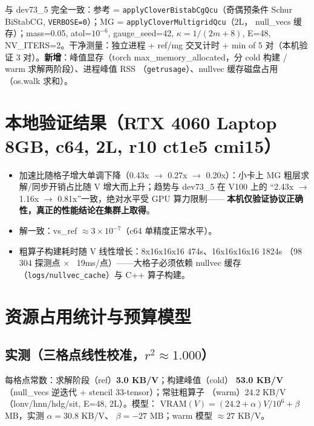 \documentclass[11pt,a4paper]{article}
\begin{document}
与 dev73\_5 完全一致：参考 = \texttt{applyCloverBistabCgQcu}（奇偶预条件 Schur
BiStabCG, \texttt{VERBOSE=0}）；MG = \texttt{applyCloverMultigridQcu}（2L，
null\_vecs 缓存）；mass=0.05, atol=$10^{-6}$, gauge\_seed=42,
$\kappa=1/(2m+8)$, E=48, NV\_ITERS=2。干净测量：独立进程 + ref/mg 交叉计时 +
min of 5 对（本机验证 3 对）。\textbf{新增}：峰值显存（torch
max\_memory\_allocated，分 cold 构建 / warm 求解两阶段）、进程峰值 RSS
（\texttt{getrusage}）、nullvec 缓存磁盘占用（os.walk 求和）。

\section{本地验证结果（RTX 4060 Laptop 8GB, c64, 2L, r10 ct1e5 cmi15）}
\label{sec:local}



\begin{itemize}
  \item 加速比随格子增大单调下降（0.43x $\to$ 0.27x $\to$ 0.20x）：小卡上 MG
    粗层求解/同步开销占比随 V 增大而上升；趋势与 dev73\_5 在 V100 上的
    ``2.43x $\to$ 1.16x $\to$ 0.81x''一致，绝对水平受 GPU 算力限制——
    \textbf{本机仅验证协议正确性，真正的性能结论在集群上取得}。
  \item 解一致：vs\_ref $\approx 3\times10^{-7}$（c64 单精度正常水平）。
  \item 粗算子构建耗时随 V 线性增长：8x16x16x16 474s、16x16x16x16 1824s
    （98\,304 探测点 $\times$ ~19ms/点）——大格子必须依赖 nullvec 缓存
    （\texttt{logs/nullvec\_cache}）与 C++ 算子构建。
\end{itemize}

\section{资源占用统计与预算模型}
\label{sec:res}

\subsection{实测（三格点线性校准，$r^2\approx1.000$）}



每格点常数：求解阶段（ref）\textbf{3.0 KB/V}；构建峰值（cold）
\textbf{53.0 KB/V}（null\_vecs 逆迭代 + stencil 33-tensor）；常驻粗算子
（warm）24.2 KB/V（lonv/hnn/hdg/sit, E=48, 2L）。模型：
$\mathrm{VRAM}(V)=(24.2+\alpha)V/10^6+\beta$ MB，实测 $\alpha=30.8$ KB/V、
$\beta=-27$ MB；warm 模型 $\approx 27$ KB/V。
\end{document}
